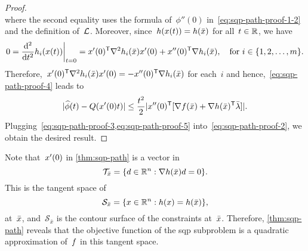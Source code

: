 \begin{proof}
\begin{subequations}
    \end{subequations}
    where the second equality uses the formula of~$\phi''(0)$ in~\cref{eq:sqp-path-proof-1-2} and the definition of~$\lag$.
    Moreover, since~$h(\iter(t)) = h(\bar{\iter})$ for all~$t \in \mathbb{R}$, we have
    \begin{equation*}
        0 = \frac{\du^2}{\du t^2} h_i(\iter(t)) \bigg\vert_{t = 0} = \iter'(0)^{\T} \nabla^2 h_i(\bar{\iter}) \iter'(0) + \iter''(0)^{\T} \nabla h_i(\bar{\iter}), \quad \text{for~$i \in \set{1, 2, \dots, m}$.}
    \end{equation*}
    Therefore,~$\iter'(0)^{\T} \nabla^2 h_i(\bar{\iter}) \iter'(0) = -\iter''(0)^{\T} \nabla h_i(\bar{\iter})$ for each~$i$ and hence,~\cref{eq:sqp-path-proof-4} leads to
    \begin{equation}
        \label{eq:sqp-path-proof-5}
        \abs{\widehat{\phi}(t) - Q(x'(0) t)} \le \frac{t^2}{2} \abs{\iter''(0)^{\T} [\nabla \obj(\bar{\iter}) + \nabla h(\bar{\iter})^{\T} \bar{\lm}]}.
    \end{equation}
    Plugging~\cref{eq:sqp-path-proof-3,eq:sqp-path-proof-5} into~\cref{eq:sqp-path-proof-2}, we obtain the desired result.
\end{proof}

Note that~$\iter'(0)$ in \cref{thm:sqp-path} is a vector in
\begin{equation*}
    \mathcal{T}_{\bar{\iter}} = \set{\step \in \R^n : \nabla h(\bar{\iter}) \step = 0}.
\end{equation*}
This is the tangent space of
\begin{equation*}
    \mathcal{S}_{\bar{x}} = \set{\iter \in \R^n : h(\iter) = h(\bar{\iter})},
\end{equation*}
at~$\bar{\iter}$, and~$\mathcal{S}_{\bar{x}}$ is the contour surface of the constraints at~$\bar{\iter}$.
Therefore, \cref{thm:sqp-path} reveals that the objective function of the \gls{sqp} subproblem is a quadratic approximation of~$f$ in this tangent space.

